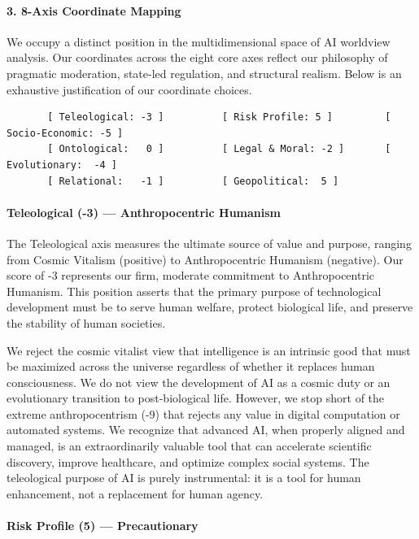 \paragraph{3. 8-Axis Coordinate
Mapping}\label{axis-coordinate-mapping-1}

We occupy a distinct position in the multidimensional space of AI
worldview analysis. Our coordinates across the eight core axes reflect
our philosophy of pragmatic moderation, state-led regulation, and
structural realism. Below is an exhaustive justification of our
coordinate choices.

\begin{verbatim}
       [ Teleological: -3 ]          [ Risk Profile: 5 ]         [ Socio-Economic: -5 ]
       [ Ontological:   0 ]          [ Legal & Moral: -2 ]       [ Evolutionary:  -4 ]
       [ Relational:   -1 ]          [ Geopolitical:  5 ]
\end{verbatim}

\paragraph{Teleological (-3) --- Anthropocentric
Humanism}\label{teleological--3-anthropocentric-humanism}

The Teleological axis measures the ultimate source of value and purpose,
ranging from Cosmic Vitalism (positive) to Anthropocentric Humanism
(negative). Our score of -3 represents our firm, moderate commitment to
Anthropocentric Humanism. This position asserts that the primary purpose
of technological development must be to serve human welfare, protect
biological life, and preserve the stability of human societies.

We reject the cosmic vitalist view that intelligence is an intrinsic
good that must be maximized across the universe regardless of whether it
replaces human consciousness. We do not view the development of AI as a
cosmic duty or an evolutionary transition to post-biological life.
However, we stop short of the extreme anthropocentrism (-9) that rejects
any value in digital computation or automated systems. We recognize that
advanced AI, when properly aligned and managed, is an extraordinarily
valuable tool that can accelerate scientific discovery, improve
healthcare, and optimize complex social systems. The teleological
purpose of AI is purely instrumental: it is a tool for human
enhancement, not a replacement for human agency.

\paragraph{Risk Profile (5) ---
Precautionary}\label{risk-profile-5-precautionary}

